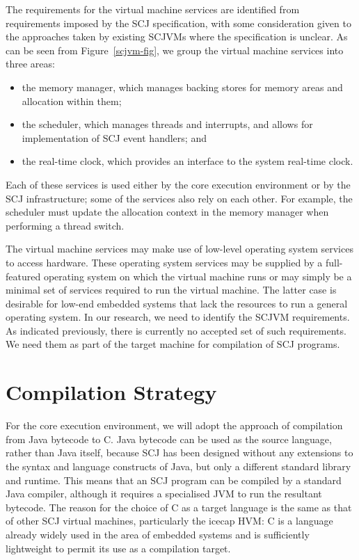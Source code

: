 \documentclass[a4paper,10pt]{report}
\begin{document}
The requirements for the virtual machine services are identified from
requirements imposed by the SCJ specification, with some consideration
given to the approaches taken by existing SCJVMs where the
specification is unclear.
As can be seen from Figure~\ref{scjvm-fig}, we group the virtual
machine services into three areas:
\begin{itemize}
\item the memory manager, which manages backing stores for memory
  areas and allocation within them;
\item the scheduler, which manages threads and interrupts, and allows
  for implementation of SCJ event handlers; and
\item the real-time clock, which provides an interface to the system
  real-time clock.
\end{itemize}
Each of these services is used either by the core execution
environment or by the SCJ infrastructure; some of the services also
rely on each other.
For example, the scheduler must update the allocation context in the
memory manager when performing a thread switch.

The virtual machine services may make use of low-level operating
system services to access hardware.
These operating system services may be supplied by a full-featured
operating system on which the virtual machine runs or may simply be a
minimal set of services required to run the virtual machine.
The latter case is desirable for low-end embedded systems that lack
the resources to run a general operating system.
In our research, we need to identify the SCJVM requirements.
As indicated previously, there is currently no accepted set of such
requirements.
We need them as part of the target machine for compilation of SCJ
programs.

\section{Compilation Strategy}

For the core execution environment, we will adopt the approach of
compilation from Java bytecode to C.
Java bytecode can be used as the source language, rather than Java
itself, because SCJ has been designed without any extensions to the
syntax and language constructs of Java, but only a different standard
library and runtime.
This means that an SCJ program can be compiled by a standard Java
compiler, although it requires a specialised JVM to run the resultant
bytecode.
The reason for the choice of C as a target language is the same as
that of other SCJ virtual machines, particularly the icecap HVM: C is
a language already widely used in the area of embedded systems and is
sufficiently lightweight to permit its use as a compilation target.
\end{document}
